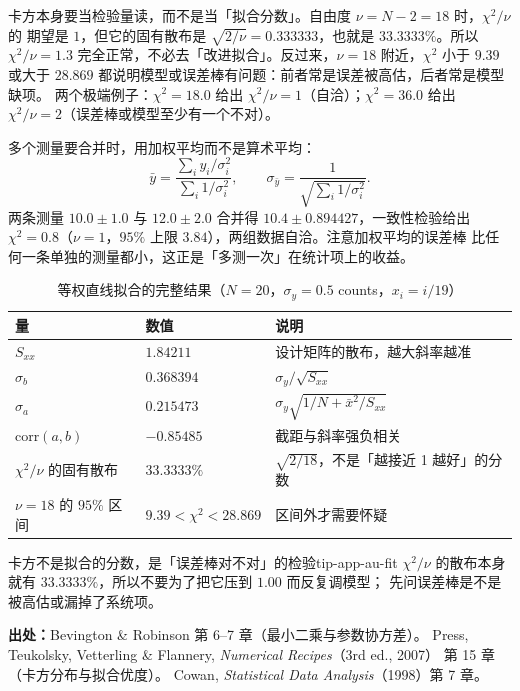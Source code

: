 卡方本身要当检验量读，而不是当「拟合分数」。自由度 $\nu=N-2=18$ 时，$\chi^2/\nu$ 的
期望是 $1$，但它的固有散布是 $\sqrt{2/\nu}=0.333333$，也就是 $33.3333\%$。所以
$\chi^2/\nu=1.3$ 完全正常，不必去「改进拟合」。反过来，$\nu=18$ 附近，$\chi^2$ 小于
$9.39$ 或大于 $28.869$ 都说明模型或误差棒有问题：前者常是误差被高估，后者常是模型缺项。
两个极端例子：$\chi^2=18.0$ 给出 $\chi^2/\nu=1$（自洽）；$\chi^2=36.0$ 给出
$\chi^2/\nu=2$（误差棒或模型至少有一个不对）。

多个测量要合并时，用加权平均而不是算术平均：
\begin{equation}
\bar y=\frac{\sum_i y_i/\sigma_i^2}{\sum_i 1/\sigma_i^2},\qquad
\sigma_{\bar y}=\frac{1}{\sqrt{\sum_i 1/\sigma_i^2}} .
\label{eq:app-au-wmean}
\end{equation}
两条测量 $10.0\pm1.0$ 与 $12.0\pm2.0$ 合并得 $10.4\pm0.894427$，一致性检验给出
$\chi^2=0.8$（$\nu=1$，$95\%$ 上限 $3.84$），两组数据自洽。注意加权平均的误差棒
比任何一条单独的测量都小，这正是「多测一次」在统计项上的收益。

\begin{table}[htbp]
\centering
\small
\caption{等权直线拟合的完整结果（$N=20$，$\sigma_y=0.5$ counts，$x_i=i/19$）}
\label{tab:app-au-fit}
\begin{tabular}{p{4.6cm}p{4.0cm}p{5.6cm}}
\hline
量 & 数值 & 说明 \\
\hline
$S_{xx}$ & $1.84211$ & 设计矩阵的散布，越大斜率越准 \\
$\sigma_b$ & $0.368394$ & $\sigma_y/\sqrt{S_{xx}}$ \\
$\sigma_a$ & $0.215473$ & $\sigma_y\sqrt{1/N+\bar x^2/S_{xx}}$ \\
$\mathrm{corr}(a,b)$ & $-0.85485$ & 截距与斜率强负相关 \\
$\chi^2/\nu$ 的固有散布 & $33.3333\%$ & $\sqrt{2/18}$，不是「越接近 1 越好」的分数 \\
$\nu=18$ 的 $95\%$ 区间 & $9.39<\chi^2<28.869$ & 区间外才需要怀疑 \\
\hline
\end{tabular}
\end{table}

\begin{tip}{卡方不是拟合的分数，是「误差棒对不对」的检验}{tip-app-au-fit}
$\chi^2/\nu$ 的散布本身就有 $33.3333\%$，所以不要为了把它压到 $1.00$ 而反复调模型；
先问误差棒是不是被高估或漏掉了系统项。
\end{tip}

{\small

\textbf{出处：}Bevington \& Robinson 第 6--7 章（最小二乘与参数协方差）。
Press, Teukolsky, Vetterling \& Flannery, \emph{Numerical Recipes}（3rd ed., 2007）
第 15 章（卡方分布与拟合优度）。
Cowan, \emph{Statistical Data Analysis}（1998）第 7 章。
}

